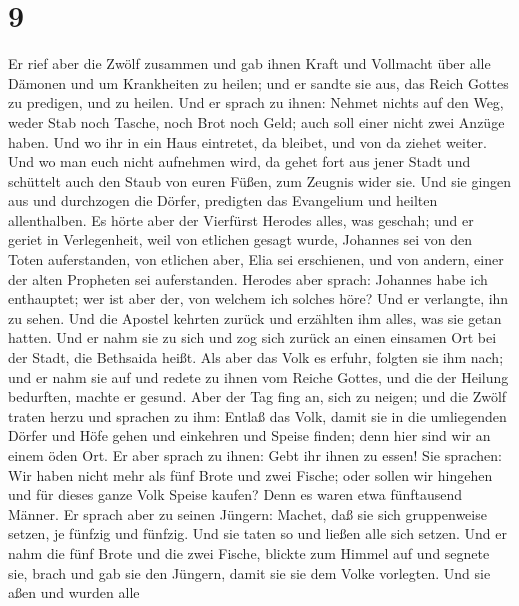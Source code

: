 \hypertarget{section-8}{%
\section{9}\label{section-8}}

 Er rief aber die Zwölf zusammen und gab ihnen Kraft und
Vollmacht über alle Dämonen und um Krankheiten zu heilen; 
und er sandte sie aus, das Reich Gottes zu predigen, und zu heilen.
 Und er sprach zu ihnen: Nehmet nichts auf den Weg, weder
Stab noch Tasche, noch Brot noch Geld; auch soll einer nicht zwei Anzüge
haben.  Und wo ihr in ein Haus eintretet, da bleibet, und
von da ziehet weiter.  Und wo man euch nicht aufnehmen
wird, da gehet fort aus jener Stadt und schüttelt auch den Staub von
euren Füßen, zum Zeugnis wider sie.  Und sie gingen aus
und durchzogen die Dörfer, predigten das Evangelium und heilten
allenthalben.  Es hörte aber der Vierfürst Herodes alles,
was geschah; und er geriet in Verlegenheit, weil von etlichen gesagt
wurde, Johannes sei von den Toten auferstanden,  von
etlichen aber, Elia sei erschienen, und von andern, einer der alten
Propheten sei auferstanden.  Herodes aber sprach: Johannes
habe ich enthauptet; wer ist aber der, von welchem ich solches höre? Und
er verlangte, ihn zu sehen.  Und die Apostel kehrten
zurück und erzählten ihm alles, was sie getan hatten. Und er nahm sie zu
sich und zog sich zurück an einen einsamen Ort bei der Stadt, die
Bethsaida heißt.  Als aber das Volk es erfuhr, folgten
sie ihm nach; und er nahm sie auf und redete zu ihnen vom Reiche Gottes,
und die der Heilung bedurften, machte er gesund.  Aber
der Tag fing an, sich zu neigen; und die Zwölf traten herzu und sprachen
zu ihm: Entlaß das Volk, damit sie in die umliegenden Dörfer und Höfe
gehen und einkehren und Speise finden; denn hier sind wir an einem öden
Ort.  Er aber sprach zu ihnen: Gebt ihr ihnen zu essen!
Sie sprachen: Wir haben nicht mehr als fünf Brote und zwei Fische; oder
sollen wir hingehen und für dieses ganze Volk Speise kaufen?
 Denn es waren etwa fünftausend Männer. Er sprach aber zu
seinen Jüngern: Machet, daß sie sich gruppenweise setzen, je fünfzig und
fünfzig.  Und sie taten so und ließen alle sich setzen.
 Und er nahm die fünf Brote und die zwei Fische, blickte
zum Himmel auf und segnete sie, brach und gab sie den Jüngern, damit sie
sie dem Volke vorlegten.  Und sie aßen und wurden alle
